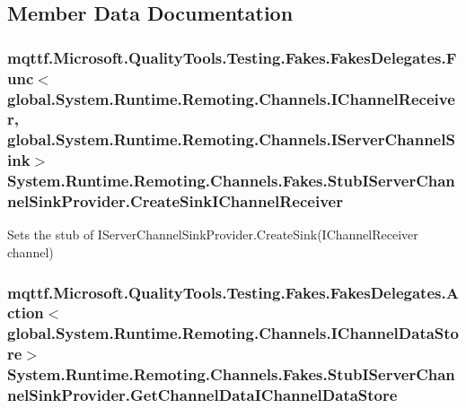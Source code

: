 \subsection{Member Data Documentation}
\hypertarget{class_system_1_1_runtime_1_1_remoting_1_1_channels_1_1_fakes_1_1_stub_i_server_channel_sink_provider_a4e5956ec597ee075886e186c5dbb8c45}{
\subsubsection[{Create\-Sink\-I\-Channel\-Receiver}]{\setlength{\rightskip}{0pt plus 5cm}mqttf.\-Microsoft.\-Quality\-Tools.\-Testing.\-Fakes.\-Fakes\-Delegates.\-Func$<$global.\-System.\-Runtime.\-Remoting.\-Channels.\-I\-Channel\-Receiver, global.\-System.\-Runtime.\-Remoting.\-Channels.\-I\-Server\-Channel\-Sink$>$ System.\-Runtime.\-Remoting.\-Channels.\-Fakes.\-Stub\-I\-Server\-Channel\-Sink\-Provider.\-Create\-Sink\-I\-Channel\-Receiver}}\label{class_system_1_1_runtime_1_1_remoting_1_1_channels_1_1_fakes_1_1_stub_i_server_channel_sink_provider_a4e5956ec597ee075886e186c5dbb8c45}


Sets the stub of I\-Server\-Channel\-Sink\-Provider.\-Create\-Sink(\-I\-Channel\-Receiver channel)

\hypertarget{class_system_1_1_runtime_1_1_remoting_1_1_channels_1_1_fakes_1_1_stub_i_server_channel_sink_provider_a2dc66dcc5e2067b5bee4c6b70a03720e}{
\subsubsection[{Get\-Channel\-Data\-I\-Channel\-Data\-Store}]{\setlength{\rightskip}{0pt plus 5cm}mqttf.\-Microsoft.\-Quality\-Tools.\-Testing.\-Fakes.\-Fakes\-Delegates.\-Action$<$global.\-System.\-Runtime.\-Remoting.\-Channels.\-I\-Channel\-Data\-Store$>$ System.\-Runtime.\-Remoting.\-Channels.\-Fakes.\-Stub\-I\-Server\-Channel\-Sink\-Provider.\-Get\-Channel\-Data\-I\-Channel\-Data\-Store}}\label{class_system_1_1_runtime_1_1_remoting_1_1_channels_1_1_fakes_1_1_stub_i_server_channel_sink_provider_a2dc66dcc5e2067b5bee4c6b70a03720e}


